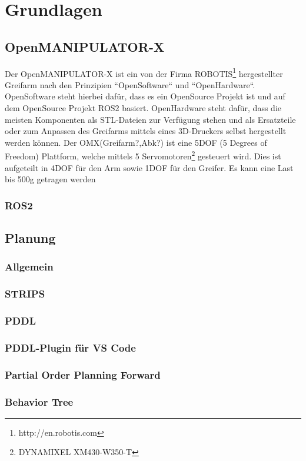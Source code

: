 \section {Grundlagen}
\subsection{OpenMANIPULATOR-X}
Der OpenMANIPULATOR-X ist ein von der Firma ROBOTIS{\footnote{http://en.robotis.com}} hergestellter Greifarm nach den Prinzipien ``OpenSoftware`` und ``OpenHardware``. OpenSoftware steht hierbei dafür, dass es ein OpenSource Projekt ist und auf dem OpenSource Projekt \ac{ROS2} basiert. OpenHardware steht dafür, dass die meisten Komponenten als STL-Dateien zur Verfügung stehen und als Ersatzteile oder zum Anpassen des Greifarms mittels eines 3D-Druckers selbst hergestellt werden können. \newline
Der OMX(Greifarm?,Abk?) ist eine 5DOF (5 Degrees of Freedom) Plattform, welche mittels 5 Servomotoren{\footnote{DYNAMIXEL XM430-W350-T}} gesteuert wird. Dies ist aufgeteilt in 4DOF für den Arm sowie 1DOF für den Greifer.
Es kann eine Last bis 500g getragen werden
\subsubsection{ROS2}
\subsection {Planung}
\subsubsection{Allgemein}
\subsubsection{STRIPS}
\subsubsection{PDDL}
\subsubsection{PDDL-Plugin für VS Code}
\subsubsection{Partial Order Planning Forward}
{\cite{popf}}
\subsubsection{Behavior Tree}

\newpage